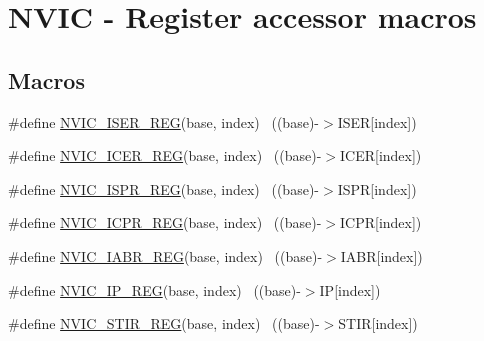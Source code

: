 \hypertarget{group___n_v_i_c___register___accessor___macros}{}\section{N\+V\+IC -\/ Register accessor macros}
\label{group___n_v_i_c___register___accessor___macros}
\subsection*{Macros}
\begin{DoxyCompactItemize}
\item 
\#define \hyperlink{group___n_v_i_c___register___accessor___macros_ga7009a9a09ee7fbb0b2af4cf99eadac4f}{N\+V\+I\+C\+\_\+\+I\+S\+E\+R\+\_\+\+R\+EG}(base,  index)                            ~((base)-\/$>$I\+S\+ER\mbox{[}index\mbox{]})
\item 
\#define \hyperlink{group___n_v_i_c___register___accessor___macros_gac8c6980a2505e16c70595552bc4da081}{N\+V\+I\+C\+\_\+\+I\+C\+E\+R\+\_\+\+R\+EG}(base,  index)                            ~((base)-\/$>$I\+C\+ER\mbox{[}index\mbox{]})
\item 
\#define \hyperlink{group___n_v_i_c___register___accessor___macros_ga6678e35df7fd1dd4a3f515e73983377c}{N\+V\+I\+C\+\_\+\+I\+S\+P\+R\+\_\+\+R\+EG}(base,  index)                            ~((base)-\/$>$I\+S\+PR\mbox{[}index\mbox{]})
\item 
\#define \hyperlink{group___n_v_i_c___register___accessor___macros_gac541bfbfb551d341170d1535a18208b9}{N\+V\+I\+C\+\_\+\+I\+C\+P\+R\+\_\+\+R\+EG}(base,  index)                            ~((base)-\/$>$I\+C\+PR\mbox{[}index\mbox{]})
\item 
\#define \hyperlink{group___n_v_i_c___register___accessor___macros_gafa3b717b76dfe3379645d3c4eaebaf6b}{N\+V\+I\+C\+\_\+\+I\+A\+B\+R\+\_\+\+R\+EG}(base,  index)                            ~((base)-\/$>$I\+A\+BR\mbox{[}index\mbox{]})
\item 
\#define \hyperlink{group___n_v_i_c___register___accessor___macros_gac7b3df65f95ff3ad60a655db439a45a2}{N\+V\+I\+C\+\_\+\+I\+P\+\_\+\+R\+EG}(base,  index)                                ~((base)-\/$>$IP\mbox{[}index\mbox{]})
\item 
\#define \hyperlink{group___n_v_i_c___register___accessor___macros_gae670827a5fdf3912afe9fa24578a19e3}{N\+V\+I\+C\+\_\+\+S\+T\+I\+R\+\_\+\+R\+EG}(base,  index)                            ~((base)-\/$>$S\+T\+IR\mbox{[}index\mbox{]})

\end{DoxyCompactItemize}
